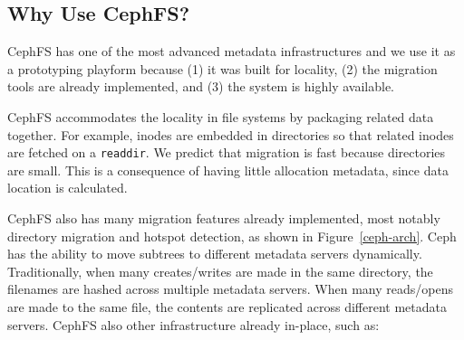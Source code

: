 \subsection*{Why Use CephFS?}
\label{background-why}

CephFS has one of the most advanced metadata infrastructures and we use it as a
prototyping playform because (1) it was built for locality, (2) the migration
tools are already implemented, and (3) the system is highly available. 

CephFS accommodates the locality in file systems by packaging related data
together. For example, inodes are embedded in directories so that related
inodes are fetched on a \texttt{readdir}. We predict that migration is fast
because directories are small. This is a consequence of having little
allocation metadata, since data location is calculated. 

CephFS also has many migration features already implemented, most notably
directory migration and hotspot detection, as shown in Figure~\ref{ceph-arch}.
Ceph has the ability to move subtrees to different metadata servers
dynamically. Traditionally, when many creates/writes are made in the same
directory, the filenames are hashed across multiple metadata servers. When many
reads/opens are made to the same file, the contents are replicated across
different metadata servers. CephFS also other infrastructure already in-place,
such as: 

